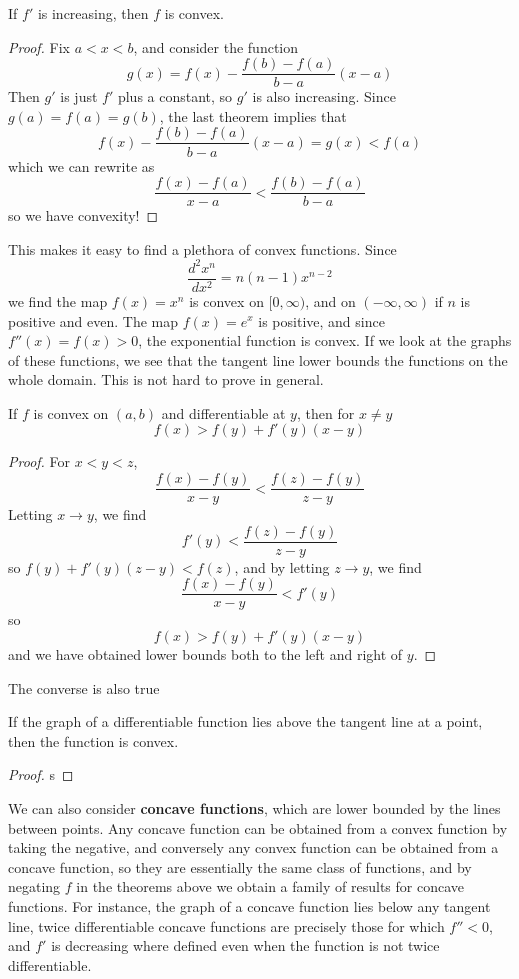 \begin{corollary}
    If $f'$ is increasing, then $f$ is convex.
\end{corollary}
\begin{proof}
    Fix $a < x < b$, and consider the function
    \[ g(x) = f(x) - \frac{f(b) - f(a)}{b - a} (x - a) \]
    Then $g'$ is just $f'$ plus a constant, so $g'$ is also increasing. Since $g(a) = f(a) = g(b)$, the last theorem implies that
    \[ f(x) - \frac{f(b) - f(a)}{b - a}(x - a) = g(x) < f(a) \]
    which we can rewrite as
    \[ \frac{f(x) - f(a)}{x - a} < \frac{f(b) - f(a)}{b-a} \]
    so we have convexity!
\end{proof}

This makes it easy to find a plethora of convex functions. Since
%
\[ \frac{d^2x^n}{dx^2} = n(n-1)x^{n-2} \]
%
we find the map $f(x) = x^n$ is convex on $[0,\infty)$, and on $(-\infty,\infty)$ if $n$ is positive and even. The map $f(x) = e^x$ is positive, and since $f''(x) = f(x) > 0$, the exponential function is convex. If we look at the graphs of these functions, we see that the tangent line lower bounds the functions on the whole domain. This is not hard to prove in general.

\begin{theorem}
    If $f$ is convex on $(a,b)$ and differentiable at $y$, then for $x \neq y$
    \[ f(x) > f(y) + f'(y)(x - y) \]
\end{theorem}
\begin{proof}
    For $x < y < z$,
    \[ \frac{f(x) - f(y)}{x - y} < \frac{f(z) - f(y)}{z - y} \]
    Letting $x \to y$, we find
    \[ f'(y) < \frac{f(z) - f(y)}{z - y} \]
    so $f(y) + f'(y)(z - y) < f(z)$, and by letting $z \to y$, we find
    \[ \frac{f(x) - f(y)}{x - y} < f'(y) \]
    so
    \[ f(x) > f(y) + f'(y)(x - y) \]
    and we have obtained lower bounds both to the left and right of $y$.
\end{proof}

The converse is also true

\begin{theorem}
    If the graph of a differentiable function lies above the tangent line at a point, then the function is convex.
\end{theorem}
\begin{proof}
    s
\end{proof}

We can also consider {\bf concave functions}, which are lower bounded by the lines between points. Any concave function can be obtained from a convex function by taking the negative, and conversely any convex function can be obtained from a concave function, so they are essentially the same class of functions, and by negating $f$ in the theorems above we obtain a family of results for concave functions. For instance, the graph of a concave function lies below any tangent line, twice differentiable concave functions are precisely those for which $f'' < 0$, and $f'$ is decreasing where defined even when the function is not twice differentiable.

